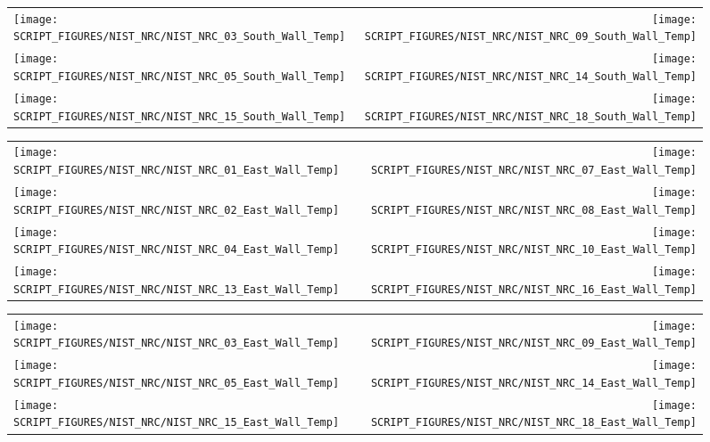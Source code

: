 \begin{figure}[!ht]
\begin{tabular*}{\textwidth}{l@{\extracolsep{\fill}}r}
\texttt{[image: SCRIPT\_FIGURES/NIST\_NRC/NIST\_NRC\_03\_South\_Wall\_Temp]} &
\texttt{[image: SCRIPT\_FIGURES/NIST\_NRC/NIST\_NRC\_09\_South\_Wall\_Temp]} \\
\texttt{[image: SCRIPT\_FIGURES/NIST\_NRC/NIST\_NRC\_05\_South\_Wall\_Temp]} &
\texttt{[image: SCRIPT\_FIGURES/NIST\_NRC/NIST\_NRC\_14\_South\_Wall\_Temp]} \\
\texttt{[image: SCRIPT\_FIGURES/NIST\_NRC/NIST\_NRC\_15\_South\_Wall\_Temp]} &
\texttt{[image: SCRIPT\_FIGURES/NIST\_NRC/NIST\_NRC\_18\_South\_Wall\_Temp]}
\end{tabular*}
\label{NIST_NRC_South_Wall_Temp_Open}
\end{figure}

\begin{figure}[!ht]
\begin{tabular*}{\textwidth}{l@{\extracolsep{\fill}}r}
\texttt{[image: SCRIPT\_FIGURES/NIST\_NRC/NIST\_NRC\_01\_East\_Wall\_Temp]} &
\texttt{[image: SCRIPT\_FIGURES/NIST\_NRC/NIST\_NRC\_07\_East\_Wall\_Temp]} \\
\texttt{[image: SCRIPT\_FIGURES/NIST\_NRC/NIST\_NRC\_02\_East\_Wall\_Temp]} &
\texttt{[image: SCRIPT\_FIGURES/NIST\_NRC/NIST\_NRC\_08\_East\_Wall\_Temp]} \\
\texttt{[image: SCRIPT\_FIGURES/NIST\_NRC/NIST\_NRC\_04\_East\_Wall\_Temp]} &
\texttt{[image: SCRIPT\_FIGURES/NIST\_NRC/NIST\_NRC\_10\_East\_Wall\_Temp]} \\
\texttt{[image: SCRIPT\_FIGURES/NIST\_NRC/NIST\_NRC\_13\_East\_Wall\_Temp]} &
\texttt{[image: SCRIPT\_FIGURES/NIST\_NRC/NIST\_NRC\_16\_East\_Wall\_Temp]}
\end{tabular*}
\label{NIST_NRC_East_Wall_Temp_Closed}
\end{figure}

\begin{figure}[!ht]
\begin{tabular*}{\textwidth}{l@{\extracolsep{\fill}}r}
\texttt{[image: SCRIPT\_FIGURES/NIST\_NRC/NIST\_NRC\_03\_East\_Wall\_Temp]} &
\texttt{[image: SCRIPT\_FIGURES/NIST\_NRC/NIST\_NRC\_09\_East\_Wall\_Temp]} \\
\texttt{[image: SCRIPT\_FIGURES/NIST\_NRC/NIST\_NRC\_05\_East\_Wall\_Temp]} &
\texttt{[image: SCRIPT\_FIGURES/NIST\_NRC/NIST\_NRC\_14\_East\_Wall\_Temp]} \\
\texttt{[image: SCRIPT\_FIGURES/NIST\_NRC/NIST\_NRC\_15\_East\_Wall\_Temp]} &
\texttt{[image: SCRIPT\_FIGURES/NIST\_NRC/NIST\_NRC\_18\_East\_Wall\_Temp]}
\end{tabular*}
\label{NIST_NRC_East_Wall_Temp_Open}
\end{figure}

